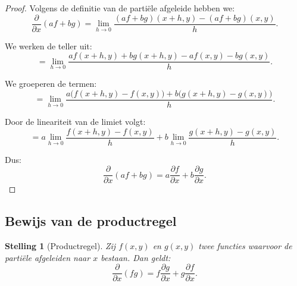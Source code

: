 \documentclass[11pt,a4paper]{article}
\newtheorem{theorem}{Stelling}[section]
\begin{document}
    \begin{proof}
        Volgens de definitie van de partiële afgeleide hebben we:
        \[
            \frac{\partial}{\partial x}(af+bg)
            =
            \lim_{h\to0}
            \frac{(af+bg)(x+h,y)-(af+bg)(x,y)}{h}.
        \]

        We werken de teller uit:
        \[
            =
            \lim_{h\to0}
            \frac{
                a f(x+h,y)+b g(x+h,y)-a f(x,y)-b g(x,y)
            }{h}.
        \]

        We groeperen de termen:
        \[
            =
            \lim_{h\to0}
            \frac{
                a\bigl(f(x+h,y)-f(x,y)\bigr)
                +
                b\bigl(g(x+h,y)-g(x,y)\bigr)
            }{h}.
        \]

        Door de lineariteit van de limiet volgt:
        \[
            =
            a \lim_{h\to0}\frac{f(x+h,y)-f(x,y)}{h}
            +
            b \lim_{h\to0}\frac{g(x+h,y)-g(x,y)}{h}.
        \]

        Dus:
        \[
            \frac{\partial}{\partial x}(af+bg)
            =
            a\frac{\partial f}{\partial x}
            +
            b\frac{\partial g}{\partial x}.
        \]
    \end{proof}

    \subsection{Bewijs van de productregel}

    \begin{theorem}[Productregel]
Zij $f(x,y)$ en $g(x,y)$ twee functies waarvoor de partiële afgeleiden naar $x$ bestaan.
Dan geldt:
\[
    \frac{\partial}{\partial x}(fg)
    =
    f\frac{\partial g}{\partial x}
    +
    g\frac{\partial f}{\partial x}.
\]
    \end{theorem}
\end{document}
